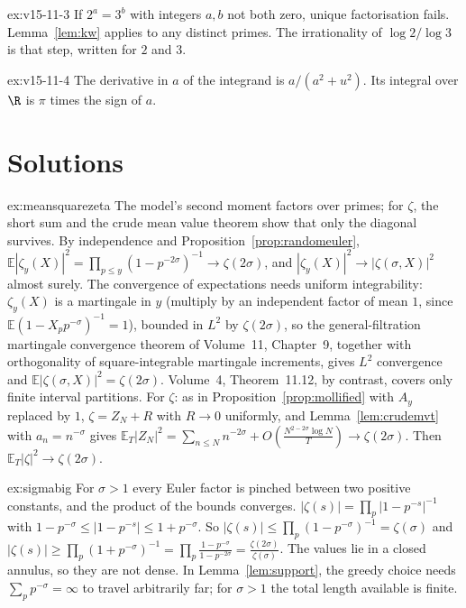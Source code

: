\begin{hint}{ex:v15-11-3}
If \(2^a=3^b\) with integers \(a,b\) not both zero, unique factorisation fails. Lemma~\ref{lem:kw} applies to any distinct primes. The irrationality of \(\log2/\log3\) is that step, written for \(2\) and \(3\).
\end{hint}

\begin{hint}{ex:v15-11-4}
The derivative in \(a\) of the integrand is \(a/(a^2+u^2)\). Its integral over \(\R\) is \(\pi\) times the sign of \(a\).
\end{hint}

\section{Solutions}

\begin{solution}{ex:meansquarezeta}
\idea The model's second moment factors over primes; for $\zeta$, the short sum and the crude mean value theorem show that only the diagonal survives.
\writeup By independence and Proposition~\ref{prop:randomeuler}, $\mathbb E|\zeta_y(X)|^2=\prod_{p\le y}(1-p^{-2\sigma})^{-1}\to\zeta(2\sigma)$, and $|\zeta_y(X)|^2\to|\zeta(\sigma,X)|^2$ almost surely. The convergence of expectations needs uniform integrability: $\zeta_y(X)$ is a martingale in $y$ (multiply by an independent factor of mean $1$, since $\mathbb E(1-X_pp^{-\sigma})^{-1}=1$), bounded in $L^2$ by $\zeta(2\sigma)$, so the general-filtration martingale convergence theorem of Volume~11, Chapter~9, together with orthogonality of square-integrable martingale increments, gives $L^2$ convergence and $\mathbb E|\zeta(\sigma,X)|^2=\zeta(2\sigma)$. Volume~4, Theorem~11.12, by contrast, covers only finite interval partitions. For $\zeta$: as in Proposition~\ref{prop:mollified} with $A_y$ replaced by $1$, $\zeta=Z_N+R$ with $R\to0$ uniformly, and Lemma~\ref{lem:crudemvt} with $a_n=n^{-\sigma}$ gives $\mathbb E_T|Z_N|^2=\sum_{n\le N}n^{-2\sigma}+O(\frac{N^{2-2\sigma}\log N}T)\to\zeta(2\sigma)$. Then $\mathbb E_T|\zeta|^2\to\zeta(2\sigma)$.
\end{solution}

\begin{solution}{ex:sigmabig}
\idea For $\sigma>1$ every Euler factor is pinched between two positive constants, and the product of the bounds converges.
\writeup $|\zeta(s)|=\prod_p|1-p^{-s}|^{-1}$ with $1-p^{-\sigma}\le|1-p^{-s}|\le1+p^{-\sigma}$. So $|\zeta(s)|\le\prod_p(1-p^{-\sigma})^{-1}=\zeta(\sigma)$ and $|\zeta(s)|\ge\prod_p(1+p^{-\sigma})^{-1}=\prod_p\frac{1-p^{-\sigma}}{1-p^{-2\sigma}}=\frac{\zeta(2\sigma)}{\zeta(\sigma)}$. The values lie in a closed annulus, so they are not dense. In Lemma~\ref{lem:support}, the greedy choice needs $\sum_pp^{-\sigma}=\infty$ to travel arbitrarily far; for $\sigma>1$ the total length available is finite.
\end{solution}

